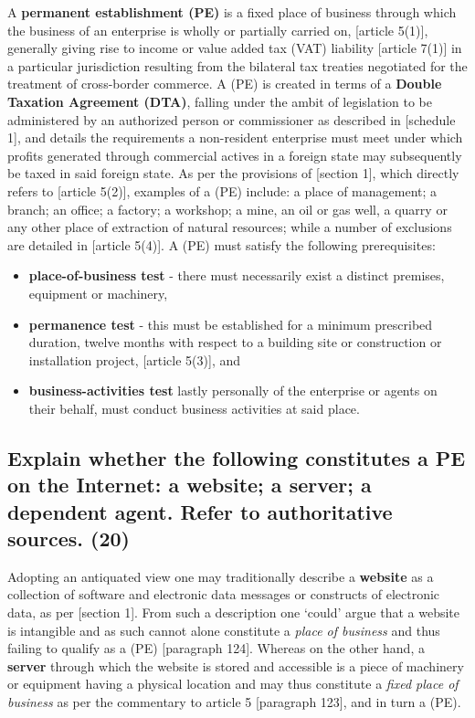 \documentclass[11pt]{article}
\begin{document}
A \textbf{permanent establishment (PE)} is a fixed place of business through which the
business of an enterprise is wholly or partially carried on, [article
5(1)]\cite{oecd17_model_tax}, generally giving rise to income or value added tax
(VAT) liability [article 7(1)]\cite{oecd17_model_tax} in a particular jurisdiction
resulting from the bilateral tax treaties negotiated for the treatment of
cross-border commerce. A (PE) is created in terms of a \textbf{Double Taxation
Agreement (DTA)}, falling under the ambit of legislation to be administered by
an authorized person or commissioner as described in [schedule
1]\cite{rsa97_sars_act}, and details the requirements a non-resident enterprise
must meet under which profits generated through commercial actives in a foreign
state may subsequently be taxed in said foreign state. As per the provisions of
[section 1]\cite{rsa62_income_tax}, which directly refers to [article
5(2)]\cite{oecd17_model_tax}, examples of a (PE) include: a place of management; a
branch; an office; a factory; a workshop; a mine, an oil or gas well, a quarry
or any other place of extraction of natural resources; while a number of
exclusions are detailed in [article 5(4)]\cite{oecd17_model_tax}. A (PE) must satisfy the following prerequisites:
\begin{itemize}
\item \textbf{place-of-business test} - there must necessarily exist a distinct premises,
equipment or machinery,
\item \textbf{permanence test} - this must be established for a minimum prescribed
duration, twelve months with respect to a building site or construction or
installation project, [article 5(3)]\cite{oecd17_model_tax}, and
\item \textbf{business-activities test} lastly personally of the enterprise or agents on
their behalf, must conduct business activities at said place.
\end{itemize}

\subsection{Explain whether the following constitutes a PE on the Internet: a website; a server; a dependent agent. Refer to authoritative sources. (20)}
\label{sec:orgdeda852}

Adopting an antiquated view one may traditionally describe a \textbf{website} as a
collection of software and electronic data messages or constructs of electronic
data, as per [section 1]\cite{rsa02_elect_comm_trans_act}. From such a description
one `could' argue that a website is intangible and as such cannot alone
constitute a \emph{place of business} and thus failing to qualify as a (PE)
[paragraph 124]\cite{oecd17_model_tax}. Whereas on
the other hand, a \textbf{server} through which the website is stored and accessible is
a piece of machinery or equipment having a physical location and may thus
constitute a \emph{fixed place of business} as per the commentary to article 5
[paragraph 123]\cite{oecd17_model_tax}, and in turn a (PE).\\
\end{document}
